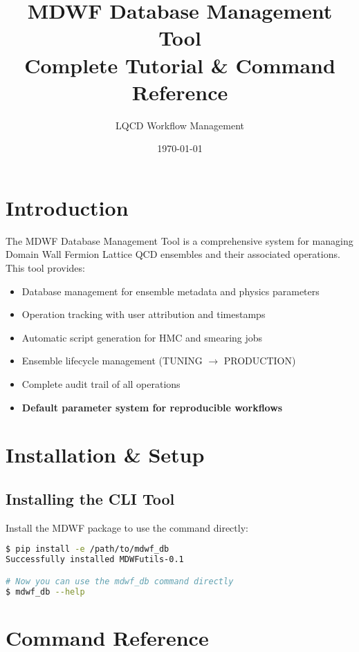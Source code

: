\documentclass{article}
\title{MDWF Database Management Tool\\Complete Tutorial \& Command Reference}
\author{LQCD Workflow Management}
\date{\today}
\newcommand{\code}[1]{\texttt{\detokenize{#1}}}
\begin{document}
\maketitle

\tableofcontents
\newpage

\section{Introduction}

The MDWF Database Management Tool is a comprehensive system for managing Domain Wall Fermion Lattice QCD ensembles and their associated operations. This tool provides:

\begin{itemize}
\item Database management for ensemble metadata and physics parameters
\item Operation tracking with user attribution and timestamps
\item Automatic script generation for HMC and smearing jobs
\item Ensemble lifecycle management (TUNING $\rightarrow$ PRODUCTION)
\item Complete audit trail of all operations
\item \textbf{Default parameter system for reproducible workflows}
\end{itemize}

\section{Installation \& Setup}

\subsection{Installing the CLI Tool}

Install the MDWF package to use the \code{mdwf_db} command directly:

\begin{lstlisting}[language=bash, caption=Installing MDWF CLI]
$ pip install -e /path/to/mdwf_db
Successfully installed MDWFutils-0.1

# Now you can use the mdwf_db command directly
$ mdwf_db --help
\end{lstlisting}

\section{Command Reference}
\end{document}
